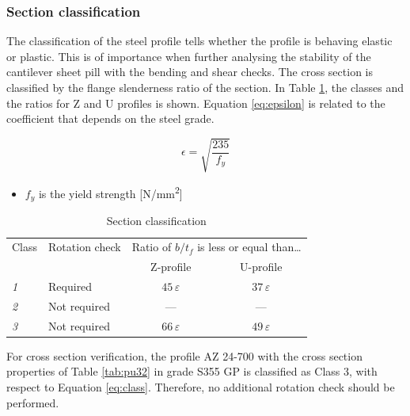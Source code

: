 \subsubsection{Section classification}

The classification of the steel profile tells whether the profile is behaving elastic or plastic. This is of importance when further analysing the stability of the cantilever sheet pill with the bending and shear checks. The cross section is classified by the flange slenderness ratio of the section. In Table \ref{tab:section_classification}, the classes and the ratios for Z and U profiles is shown. Equation \ref{eq:epsilon} is related to the coefficient that depends on the steel grade. 

\begin{equation}
    \epsilon = \sqrt{\frac{235}{f_{y}}}
    \label{eq:epsilon}
\end{equation}

\begin{itemize}
    \item $f_{y}$ is the yield strength [N/mm\textsuperscript{2}]
\end{itemize}

\begin{table}[H]
  \centering
  \small
  \setlength{\tabcolsep}{8pt}
  \renewcommand{\arraystretch}{1.15}
  \caption{Section classification}
  \label{tab:section_classification}
  \begin{tabular}{@{}l l c c@{}}
    \toprule
    \multicolumn{1}{l}{Class} &
    \multicolumn{1}{l}{Rotation check} &
    \multicolumn{2}{c}{Ratio of $b/t_f$ is less or equal than\ldots} \\
    \cmidrule(lr){3-4}
    & & Z-profile & U-profile \\
    \midrule
    \textit{1} & Required     & $45\,\varepsilon$ & $37\,\varepsilon$ \\
    \textit{2} & Not required & ---               & ---               \\
    \textit{3} & Not required & $66\,\varepsilon$ & $49\,\varepsilon$ \\
    \bottomrule
  \end{tabular}
\end{table}

For cross section verification, the profile AZ 24-700 with the cross section properties of Table \ref{tab:pu32} in grade S355 GP is classified as Class 3, with respect to Equation \ref{eq:class}. Therefore, no additional rotation check should be performed.

